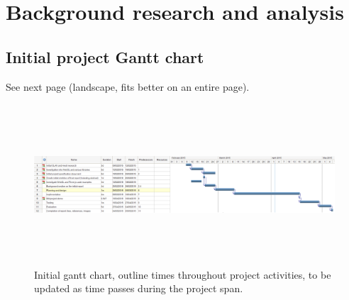 \chapter{Background research and analysis}

\section{Initial project Gantt chart}
See next page (landscape, fits better on an entire page).
\begin{landscape}
\begin{figure}[h!]
  \centering
  \label{app:gantt1}
   	\caption{Initial gantt chart, outline times throughout project activities, to be updated as time passes during the project span.}
      \includegraphics[width=23cm, height=6cm]{images/first.png}
\end{figure}
\end{landscape}
\clearpage

